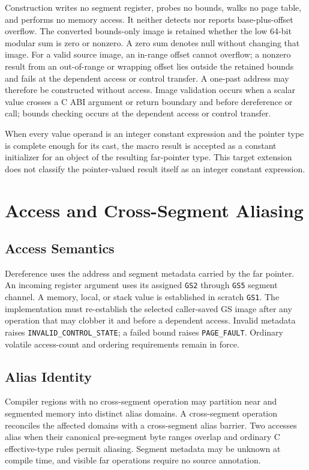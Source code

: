 \documentclass[10pt,twoside]{article}
\begin{document}
Construction writes no segment register, probes no bounds, walks no page
table, and performs no memory access. It neither detects nor reports
base-plus-offset overflow. The converted bounds-only image is retained whether
the low 64-bit modular sum is zero or nonzero. A zero sum denotes null without
changing that image. For a valid source image, an in-range offset cannot
overflow; a nonzero result from an out-of-range or wrapping offset lies outside
the retained bounds and fails at the dependent access or control transfer. A
one-past address may therefore be constructed without access.
Image validation occurs when a scalar value crosses a C ABI argument or return
boundary and before dereference or call; bounds checking occurs at the
dependent access or control transfer.

When every value operand is an integer constant expression and the pointer
type is complete enough for its cast, the macro result is accepted as a
constant initializer for an object of the resulting far-pointer type. This
target extension does not classify the pointer-valued result itself as an
integer constant expression.

\section{Access and Cross-Segment Aliasing}\label{page:access-and-cross-segment-aliasing}

\subsection{Access Semantics}
Dereference uses the address and segment metadata carried by the far pointer.
An incoming register argument uses its assigned \texttt{GS2} through
\texttt{GS5} segment channel. A memory, local, or stack value is established in
scratch \texttt{GS1}. The implementation must re-establish the selected
caller-saved GS image after any operation that may clobber it and before a
dependent access. Invalid metadata raises
\texttt{INVALID\_CONTROL\_STATE}; a failed bound raises \texttt{PAGE\_FAULT}.
Ordinary volatile access-count and ordering requirements remain in force.

\subsection{Alias Identity}
Compiler regions with no cross-segment operation may partition near and
segmented memory into distinct alias domains. A cross-segment operation
reconciles the affected domains with a cross-segment alias barrier. Two
accesses alias when their canonical pre-segment byte ranges overlap and
ordinary C effective-type rules permit aliasing. Segment metadata may be
unknown at compile time, and visible far operations require no source
annotation.
\end{document}

